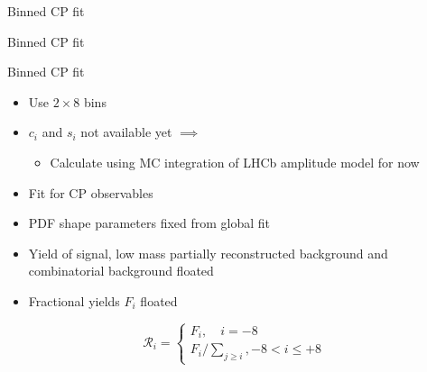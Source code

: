 \documentclass{beamer}
\begin{document}
\begin{frame}{Binned CP fit}
  \begin{center}
    {\huge Binned CP fit}
  \end{center}
\end{frame}

\begin{frame}{Binned CP fit}
  \begin{itemize}
    \setlength\itemsep{1.2em}
    \item{Use $2\times 8$ bins}
    \item{$c_i$ and $s_i$ not available yet $\implies$}
    \begin{itemize}
      \item{Calculate using MC integration of LHCb amplitude model for now}
    \end{itemize}
    \item{Fit for CP observables}
    \item{PDF shape parameters fixed from global fit}
    \item{Yield of signal, low mass partially reconstructed background and combinatorial background floated}
    \item{Fractional yields $F_i$ floated}
  \end{itemize}
  \begin{equation*}
    \mathcal{R}_i = 
    \begin{cases}
      F_i, \quad i = -8 \\
      F_i/\sum_{j\geq i}, -8 < i\leq+8
    \end{cases}
  \end{equation*}
\end{frame}
\end{document}
